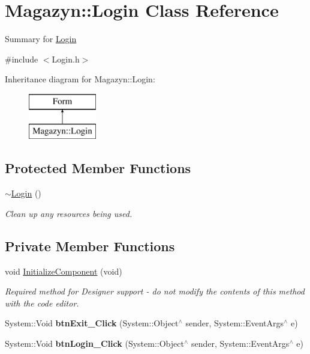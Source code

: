 \hypertarget{class_magazyn_1_1_login}{}\section{Magazyn\+:\+:Login Class Reference}
\label{class_magazyn_1_1_login}


Summary for \hyperlink{class_magazyn_1_1_login}{Login}  




{\ttfamily \#include $<$Login.\+h$>$}

Inheritance diagram for Magazyn\+:\+:Login\+:\begin{figure}[H]
\begin{center}
\leavevmode
\includegraphics[height=2.000000cm]{class_magazyn_1_1_login}
\end{center}
\end{figure}
\subsection*{Protected Member Functions}
\begin{DoxyCompactItemize}
\item 
\hyperlink{class_magazyn_1_1_login_a421c32a7433145a0ed19b25b3ea87ddc}{$\sim$\+Login} ()
\begin{DoxyCompactList}\small\item\em Clean up any resources being used. \end{DoxyCompactList}\end{DoxyCompactItemize}
\subsection*{Private Member Functions}
\begin{DoxyCompactItemize}
\item 
void \hyperlink{class_magazyn_1_1_login_ac489095816b5d1b5fb33d523c3a4c59f}{Initialize\+Component} (void)
\begin{DoxyCompactList}\small\item\em Required method for Designer support -\/ do not modify the contents of this method with the code editor. \end{DoxyCompactList}\item 
\hypertarget{class_magazyn_1_1_login_a673cb544be89c23d940f3869461b9492}{}\label{class_magazyn_1_1_login_a673cb544be89c23d940f3869461b9492} 
System\+::\+Void {\bfseries btn\+Exit\+\_\+\+Click} (System\+::\+Object$^\wedge$ sender, System\+::\+Event\+Args$^\wedge$ e)
\item 
\hypertarget{class_magazyn_1_1_login_afc6385cc98691c04cef1aaf857c5c029}{}\label{class_magazyn_1_1_login_afc6385cc98691c04cef1aaf857c5c029} 
System\+::\+Void {\bfseries btn\+Login\+\_\+\+Click} (System\+::\+Object$^\wedge$ sender, System\+::\+Event\+Args$^\wedge$ e)
\end{DoxyCompactItemize}
